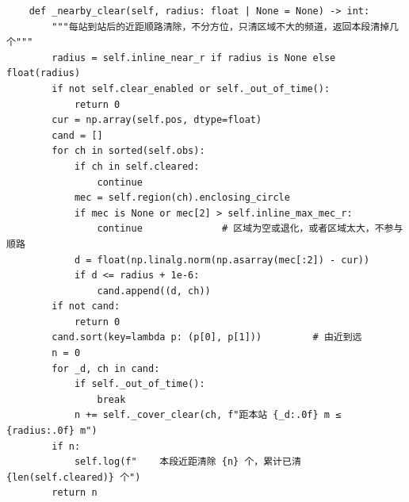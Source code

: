 \documentclass[UTF8, zihao=5,AutoFakeBold=2]{ctexart}
\begin{document}
\begin{lstlisting}
    def _nearby_clear(self, radius: float | None = None) -> int:
        """每站到站后的近距顺路清除，不分方位，只清区域不大的频道，返回本段清掉几个"""
        radius = self.inline_near_r if radius is None else float(radius)
        if not self.clear_enabled or self._out_of_time():
            return 0
        cur = np.array(self.pos, dtype=float)
        cand = []
        for ch in sorted(self.obs):
            if ch in self.cleared:
                continue
            mec = self.region(ch).enclosing_circle
            if mec is None or mec[2] > self.inline_max_mec_r:
                continue              # 区域为空或退化，或者区域太大，不参与顺路
            d = float(np.linalg.norm(np.asarray(mec[:2]) - cur))
            if d <= radius + 1e-6:
                cand.append((d, ch))
        if not cand:
            return 0
        cand.sort(key=lambda p: (p[0], p[1]))         # 由近到远
        n = 0
        for _d, ch in cand:
            if self._out_of_time():
                break
            n += self._cover_clear(ch, f"距本站 {_d:.0f} m ≤ {radius:.0f} m")
        if n:
            self.log(f"    本段近距清除 {n} 个，累计已清 {len(self.cleared)} 个")
        return n


\end{lstlisting}
\end{document}
